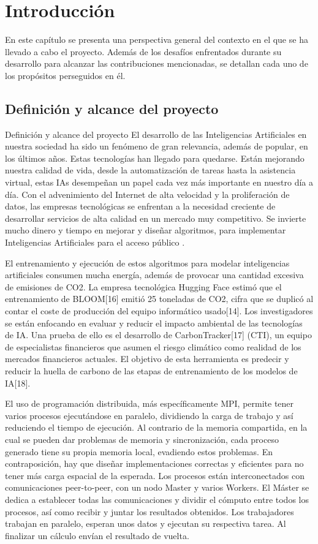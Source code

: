 \chapter{Introducción}

En este capítulo se presenta una perspectiva general del contexto en el que se ha llevado a cabo el proyecto. Además de los desafíos enfrentados durante su desarrollo para alcanzar las contribuciones mencionadas, se detallan cada uno de los propósitos perseguidos en él.


\section{Definición y alcance del proyecto}
Definición y alcance del proyecto
El desarrollo de las Inteligencias Artificiales en nuestra sociedad ha sido un fenómeno de gran relevancia, además de popular, en los últimos años. Estas tecnologías han llegado para quedarse. Están mejorando nuestra calidad de vida, desde la automatización de tareas hasta la asistencia virtual, estas IAs desempeñan un papel cada vez más importante en nuestro día a día.
Con el advenimiento del Internet de alta velocidad y la proliferación de datos, las empresas tecnológicas se enfrentan a la necesidad creciente de desarrollar servicios de alta calidad en un mercado muy competitivo. Se invierte mucho dinero y tiempo en mejorar y diseñar algoritmos, para implementar Inteligencias Artificiales para el acceso público \cite{thomas2021global}.

El entrenamiento y ejecución de estos algoritmos para modelar inteligencias artificiales consumen mucha energía, además de provocar una cantidad excesiva de emisiones de CO2. La empresa tecnológica Hugging Face estimó que el entrenamiento de BLOOM[16] emitió 25 toneladas de CO2, cifra que se duplicó al contar el coste de producción del equipo informático usado[14]. Los investigadores se están enfocando en evaluar y reducir el impacto ambiental de las tecnologías de IA. Una prueba de ello es el desarrollo de CarbonTracker[17] (CTI), un equipo de especialistas financieros que asumen el riesgo climático como realidad de los mercados financieros actuales. El objetivo de esta herramienta es predecir y reducir la huella de carbono de las etapas de entrenamiento de los modelos de IA[18].

El uso de programación distribuida, más específicamente MPI, permite tener varios procesos ejecutándose en paralelo, dividiendo la carga de trabajo y así reduciendo el tiempo de ejecución. Al contrario de la memoria compartida, en la cual se pueden dar problemas de memoria y sincronización, cada proceso generado tiene su propia memoria local, evadiendo estos problemas. En contraposición, hay que diseñar implementaciones correctas y eficientes para no tener más carga espacial de la esperada.
Los procesos están interconectados con comunicaciones peer-to-peer, con un nodo Master y varios Workers. El Máster se dedica a establecer todas las comunicaciones y dividir el cómputo entre todos los procesos, así como recibir y juntar los resultados obtenidos. Los trabajadores trabajan en paralelo, esperan unos datos y ejecutan su respectiva tarea. Al finalizar un cálculo envían el resultado de vuelta.

